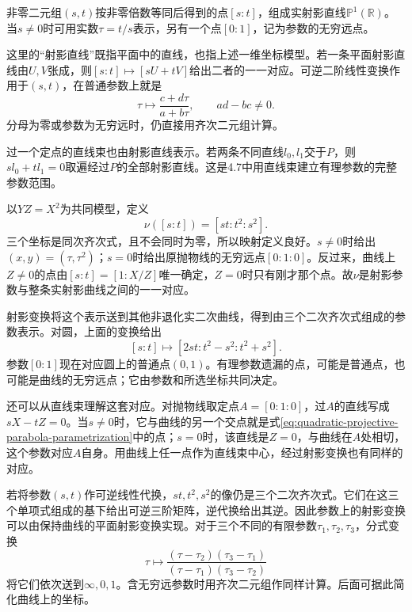 \begin{definition}
非零二元组\((s,t)\)按非零倍数等同后得到的点\([s:t]\)，组成{\heiti{}实射影直线}\(\mathbb P^1(\mathbb R)\)。当\(s\ne0\)时可用实数\(\tau=t/s\)表示，另有一个点\([0:1]\)，记为参数的无穷远点。
\end{definition}

这里的“射影直线”既指平面中的直线，也指上述一维坐标模型。若一条平面射影直线由\(U,V\)张成，则\([s:t]\mapsto[sU+tV]\)给出二者的一一对应。可逆二阶线性变换作用于\((s,t)\)，在普通参数上就是
\begin{equation}\label{eq:quadratic-projective-parameter-change}
 \tau\longmapsto\frac{c+d\tau}{a+b\tau},\qquad ad-bc\ne0.
\end{equation}
分母为零或参数为无穷远时，仍直接用齐次二元组计算。

过一个定点的直线束也由射影直线表示。若两条不同直线\(l_0,l_1\)交于\(P\)，则\(sl_0+tl_1=0\)取遍经过\(P\)的全部射影直线。这是4.7中用直线束建立有理参数的完整参数范围。

以\(Y Z=X^2\)为共同模型，定义
\begin{equation}\label{eq:quadratic-projective-parabola-parametrization}
 \nu([s:t])=[st:t^2:s^2].
\end{equation}
三个坐标是同次齐次式，且不会同时为零，所以映射定义良好。\(s\ne0\)时给出\((x,y)=(\tau,\tau^2)\)；\(s=0\)时给出原抛物线的无穷远点\([0:1:0]\)。反过来，曲线上\(Z\ne0\)的点由\([s:t]=[1:X/Z]\)唯一确定，\(Z=0\)时只有刚才那个点。故\(\nu\)是射影参数与整条实射影曲线之间的一一对应。

射影变换将这个表示送到其他非退化实二次曲线，得到由三个二次齐次式组成的参数表示。对圆，上面的变换给出
\begin{equation}\label{eq:quadratic-projective-circle-parametrization}
 [s:t]\longmapsto[2st:t^2-s^2:t^2+s^2].
\end{equation}
参数\([0:1]\)现在对应圆上的普通点\((0,1)\)。有理参数遗漏的点，可能是普通点，也可能是曲线的无穷远点；它由参数和所选坐标共同决定。

还可以从直线束理解这套对应。对抛物线取定点\(A=[0:1:0]\)，过\(A\)的直线写成\(sX-tZ=0\)。当\(s\ne0\)时，它与曲线的另一个交点就是式\eqref{eq:quadratic-projective-parabola-parametrization}中的点；\(s=0\)时，该直线是\(Z=0\)，与曲线在\(A\)处相切，这个参数对应\(A\)自身。用曲线上任一点作为直线束中心，经过射影变换也有同样的对应。

若将参数\((s,t)\)作可逆线性代换，\(st,t^2,s^2\)的像仍是三个二次齐次式。它们在这三个单项式组成的基下给出可逆三阶矩阵，逆代换给出其逆。因此参数上的射影变换可以由保持曲线的平面射影变换实现。对于三个不同的有限参数\(\tau_1,\tau_2,\tau_3\)，分式变换
\begin{equation*}
 \tau\longmapsto
 \frac{(\tau-\tau_2)(\tau_3-\tau_1)}
      {(\tau-\tau_1)(\tau_3-\tau_2)}
\end{equation*}
将它们依次送到\(\infty,0,1\)。含无穷远参数时用齐次二元组作同样计算。后面可据此简化曲线上的坐标。

